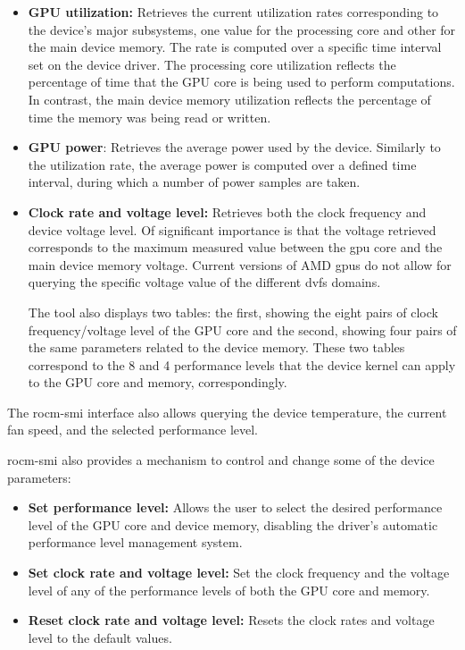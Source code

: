 \begin{itemize}
\item \textbf{GPU utilization:} Retrieves the current utilization rates corresponding to the device's major subsystems, one value for the processing core and other for the main device memory. The rate is computed over a specific time interval set on the device driver. The processing core utilization reflects the percentage of time that the GPU core is being used to perform computations. In contrast, the main device memory utilization reflects the percentage of time the memory was being read or written.

\item \textbf{GPU power}: Retrieves the average power used by the device. Similarly to the utilization rate, the average power is computed over a defined time interval, during which a number of power samples are taken.

\item \textbf{Clock rate and voltage level:} Retrieves both the clock frequency and device voltage level. Of significant importance is that the voltage retrieved corresponds to the maximum measured value between the \acrshort{gpu} core and the main device memory voltage. Current versions of AMD \acrshort{gpu}s do not allow for querying the specific voltage value of the different \acrshort{dvfs} domains.

The tool also displays two tables: the first, showing the eight pairs of clock frequency/voltage level of the GPU core and the second, showing four pairs of the same parameters related to the device memory. These two tables correspond to the 8 and 4 performance levels that the device kernel can apply to the GPU core and memory, correspondingly.
\end{itemize}

The rocm-smi interface also allows querying the device temperature, the current fan speed, and the selected performance level.

rocm-smi also provides a mechanism to control and change some of the device parameters:
\begin{itemize}
\item \textbf{Set performance level:} Allows the user to select the desired performance level of the GPU core and device memory, disabling the driver's automatic performance level management system.
\item \textbf{Set clock rate and voltage level:} Set the clock frequency and the voltage level of any of the performance levels of both the GPU core and memory. 
\item \textbf{Reset clock rate and voltage level:} Resets the clock rates and voltage level to the default values.
\end{itemize}

